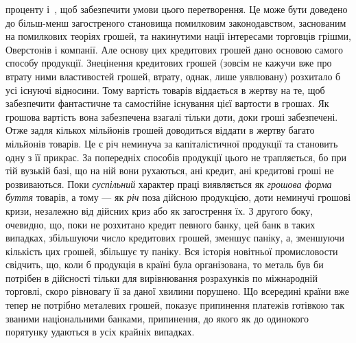 \parcont{}  %
проценту і~, щоб забезпечити умови цього перетворення. Це може бути
доведено до більш-менш загостреного становища помилковим законодавством,
заснованим на помилкових теоріях грошей, та накинутими нації інтересами
торговців грішми, Оверстонів і компанії. Але основу цих кредитових грошей
дано основою самого способу продукції. Знецінення кредитових грошей
(зовсім не кажучи вже про втрату ними властивостей грошей, втрату, однак, лише
уявлювану) розхитало б усі існуючі відносини. Тому вартість товарів віддається
в жертву на те, щоб забезпечити фантастичне та самостійне існування цієї вартости
в грошах. Як грошова вартість вона забезпечена взагалі тільки доти, доки
гроші забезпечені. Отже задля кількох мільйонів грошей доводиться віддати в жертву
багато мільйонів товарів. Це є річ неминуча за капіталістичної продукції та становить
одну з її прикрас. За попередніх способів продукції цього не трапляється, бо
при тій вузькій базі, що на ній вони рухаються, ані кредит, ані кредитові гроші не
розвиваються. Поки \emph{суспільний} характер праці виявляється як \emph{грошова форма}
\emph{буття} товарів, а тому — як \emph{річ} поза дійсною продукцією, доти неминучі грошові
кризи, незалежно від дійсних криз або як загострення їх. З другого
боку, очевидно, що, поки не розхитано кредит певного банку, цей банк в таких
випадках, збільшуючи число кредитових грошей, зменшує паніку, а, зменшуючи
кількість цих грошей, збільшує ту паніку. Вся історія новітньої промисловости
свідчить, що, коли б продукція в країні була організована, то металь був би
потрібен в дійсності тільки для вирівнювання розрахунків по міжнародній торговлі,
скоро рівновагу її за даної хвилини порушено. Що всередині країни вже тепер
не потрібно металевих грошей, показує припинення платежів готівкою так званими
національними банками, припинення, до якого як до одинокого порятунку удаються
в усіх крайніх випадках.

